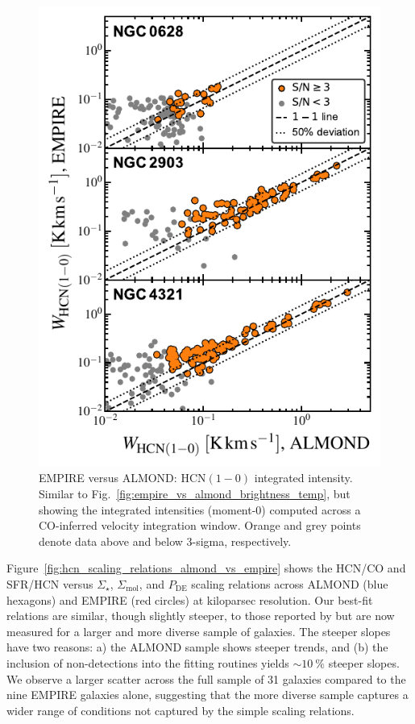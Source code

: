 \documentclass[letter, longauth]{aa} %
\newcommand*{\hcnone}{\ensuremath{\mathrm{HCN(1-0)}}\xspace} %
\newcommand*{\sigmol}{\ensuremath{\Sigma_{\text{mol}}}\xspace}  %
\newcommand*{\pde}{\ensuremath{P_{\text{DE}}}\xspace}  %
\newcommand*{\sigstar}{\ensuremath{\Sigma_{\star}}\xspace}  %
\begin{document}
\begin{appendix}
\begin{figure}
\centering
\includegraphics[width=\columnwidth]{Figures/ALMOND_vs_EMPIRE_integrated_intensities_compressed_v2.pdf}
\caption{EMPIRE versus ALMOND: \hcnone integrated intensity.
Similar to Fig.~\ref{fig:empire_vs_almond_brightness_temp}, but showing the integrated intensities (moment-0) computed across a CO-inferred velocity integration window.
Orange and grey points denote data above and below 3-sigma, respectively.
}
\label{fig:empire_vs_almond_intensity}
\end{figure}


Figure~\ref{fig:hcn_scaling_relations_almond_vs_empire} shows the HCN/CO and SFR/HCN versus \sigstar, \sigmol, and \pde scaling relations across ALMOND (blue hexagons) and EMPIRE (red circles) at kiloparsec resolution.
Our best-fit relations are similar, though slightly steeper, to those reported by \citet{Jimenez-Donaire2019} but are now measured for a larger and more diverse sample of galaxies. The steeper slopes have two reasons: a) the ALMOND sample shows steeper trends, and (b) the inclusion of non-detections into the fitting routines yields $\sim\SI{10}{\percent}$ steeper slopes. We observe a larger scatter across the full sample of 31 galaxies compared to the nine EMPIRE galaxies alone, suggesting that the more diverse sample captures a wider range of conditions not captured by the simple scaling relations.


\end{appendix}
\end{document}
